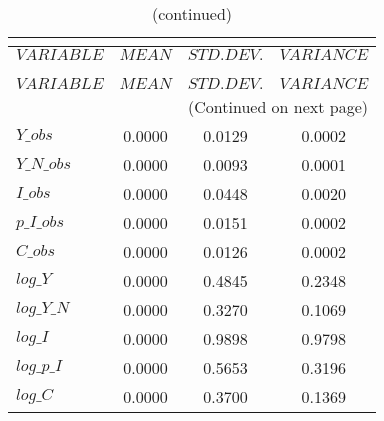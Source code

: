  
\begin{center}
\begin{longtable}{lccc} 
\caption{THEORETICAL MOMENTS}\\
 \label{Table:th_moments}\\
\toprule 
$VARIABLE   $	 & 	 $         MEAN$	 & 	 $    STD. DEV.$	 & 	 $     VARIANCE$\\
\midrule \endfirsthead 
\caption{(continued)}\\
 \toprule \\ 
$VARIABLE   $	 & 	 $         MEAN$	 & 	 $    STD. DEV.$	 & 	 $     VARIANCE$\\
\midrule \endhead 
\midrule \multicolumn{4}{r}{(Continued on next page)} \\ \bottomrule \endfoot 
\bottomrule \endlastfoot 
$Y\_obs     $	 & 	       0.0000	 & 	       0.0129	 & 	       0.0002 \\ 
$Y\_N\_obs  $	 & 	       0.0000	 & 	       0.0093	 & 	       0.0001 \\ 
$I\_obs     $	 & 	       0.0000	 & 	       0.0448	 & 	       0.0020 \\ 
$p\_I\_obs  $	 & 	       0.0000	 & 	       0.0151	 & 	       0.0002 \\ 
$C\_obs     $	 & 	       0.0000	 & 	       0.0126	 & 	       0.0002 \\ 
$log\_Y     $	 & 	       0.0000	 & 	       0.4845	 & 	       0.2348 \\ 
$log\_Y\_N  $	 & 	       0.0000	 & 	       0.3270	 & 	       0.1069 \\ 
$log\_I     $	 & 	       0.0000	 & 	       0.9898	 & 	       0.9798 \\ 
$log\_p\_I  $	 & 	       0.0000	 & 	       0.5653	 & 	       0.3196 \\ 
$log\_C     $	 & 	       0.0000	 & 	       0.3700	 & 	       0.1369 \\ 
\end{longtable}
 \end{center}
